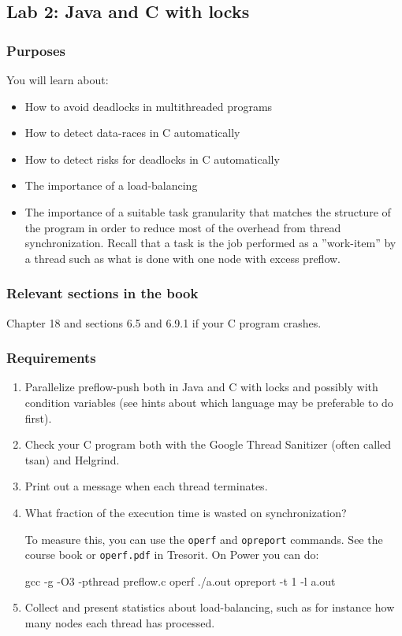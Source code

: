 \documentclass{forsete}
\begin{document}
\newpage
\subsection*{Lab 2: Java and C with locks}
\subsubsection*{Purposes}
You will learn about:
\begin{itemize}
\item How to avoid deadlocks in multithreaded programs
\item How to detect data-races in C automatically
\item How to detect risks for deadlocks in C automatically
\item The importance of a load-balancing
\item The importance of a suitable task granularity
that
matches the structure of the program in order to reduce most of the overhead from
thread synchronization.
Recall that a task is  the job performed as a ''work-item''
by a thread such as what is done with one node with excess preflow.
\end{itemize}

\subsubsection*{Relevant sections in the book}
Chapter 18 and sections 6.5 and 6.9.1 if your C program crashes.
\subsubsection*{Requirements}
\begin{enumerate}
\item Parallelize preflow-push both in Java and C with locks and possibly with
condition variables (see hints about which language may be preferable to do first).

\item Check your C program both with
the Google Thread Sanitizer (often called tsan) and Helgrind. 

\item Print out a message when each thread terminates.

\item What fraction of the execution time is wasted on synchronization?

To measure this, you can use the \verb.operf. and \verb.opreport. commands. See the course book or
\verb!operf.pdf! in Tresorit. On Power you can do:
\begin{ccode}
gcc -g -O3 -pthread preflow.c
operf ./a.out
opreport -t 1 -l a.out
\end{ccode}

\item Collect and present statistics about load-balancing, such as
for instance how many nodes each thread has processed.
\end{enumerate}
\end{document}
